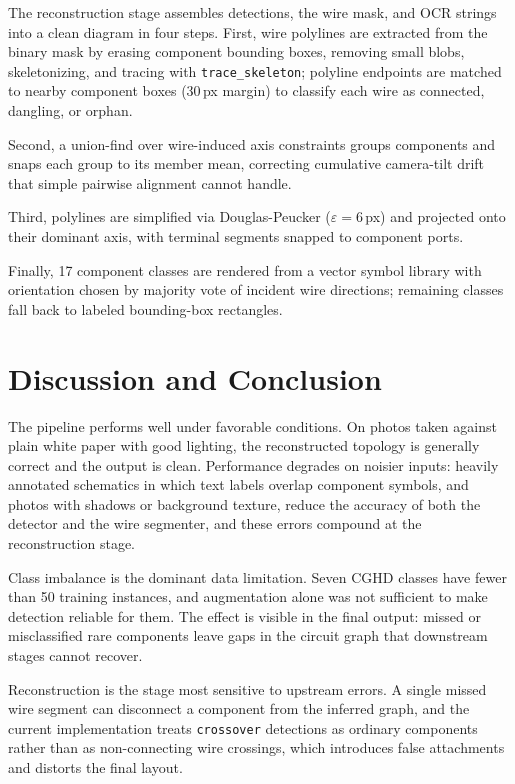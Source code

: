 \documentclass{article}
\begin{document}
The reconstruction stage assembles detections, the wire mask, and OCR
strings into a clean diagram in four steps. First, wire polylines are
extracted from the binary mask by erasing component bounding boxes,
removing small blobs, skeletonizing, and tracing with
\texttt{trace\_skeleton}; polyline endpoints are matched to nearby
component boxes (30\,px margin) to classify each wire as connected,
dangling, or orphan. 

Second, a union-find over wire-induced axis
constraints groups components and snaps each group to its member mean,
correcting cumulative camera-tilt drift that simple pairwise alignment
cannot handle. 

Third, polylines are simplified via Douglas-Peucker
($\varepsilon{=}6$\,px) and projected onto their dominant axis, with
terminal segments snapped to component ports. 

Finally, 17 component classes are rendered from a vector symbol library with orientation
chosen by majority vote of incident wire directions; remaining classes
fall back to labeled bounding-box rectangles.



\section{Discussion and Conclusion}
The pipeline performs well under favorable conditions. On photos taken against plain white paper with good lighting, the reconstructed topology is generally correct and the output is clean. Performance degrades on noisier inputs: heavily annotated schematics in which text labels overlap component symbols, and photos with shadows or background texture, reduce the accuracy of both the detector and the wire segmenter, and these errors compound at the reconstruction stage.

Class imbalance is the dominant data limitation. Seven CGHD classes have fewer than 50 training instances, and augmentation alone was not sufficient to make detection reliable for them. The effect is visible in the final output: missed or misclassified rare components leave gaps in the circuit graph that downstream stages cannot recover.

Reconstruction is the stage most sensitive to upstream errors. A single missed wire segment can disconnect a component from the inferred graph, and the current implementation treats \texttt{crossover} detections as ordinary components rather than as non-connecting wire crossings, which introduces false attachments and distorts the final layout.
\end{document}
